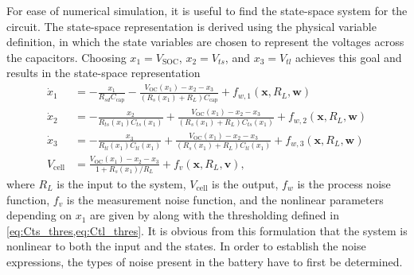 \documentclass[../zhang_thesis.tex]{subfiles}
\begin{document}
For ease of numerical simulation, it is useful to find the state-space system for the circuit. The state-space representation is derived using the physical variable definition, in which the state variables are chosen to represent the voltages across the capacitors. Choosing $x_1=V_\text{SOC}$, $x_2=V_{ts}$, and $x_3=V_{tl}$ achieves this goal and results in the state-space representation
\begin{align}
    \dot{x}_1 &= - \frac{x_1}{R_{sd}C_\text{cap}} - \frac{V_\text{OC}(x_1)-x_2-x_3}{(R_s(x_1)+R_L)C_\text{cap}} + f_{w,1}(\mathbf{x},R_L,\mathbf{w}) \\
    \dot{x}_2 &= - \frac{x_2}{R_{ts}(x_1)C_{ts}(x_1)} + \frac{V_\text{OC}(x_1) - x_2 - x_3}{(R_s(x_1)+R_L)C_{ts}(x_1)} + f_{w,2}(\mathbf{x},R_L,\mathbf{w}) \\
    \dot{x}_3 &= - \frac{x_3}{R_{tl}(x_1)C_{tl}(x_1)} + \frac{V_\text{OC}(x_1) - x_2 - x_3}{(R_s(x_1)+R_L)C_{tl}(x_1)} + f_{w,3}(\mathbf{x},R_L,\mathbf{w}) \\
    V_\text{cell} &= \frac{V_\text{OC}(x_1) - x_2 - x_3}{1+R_s(x_1)/R_L} + f_v(\mathbf{x},R_L,\mathbf{v}),
\end{align}
where $R_L$ is the input to the system, $V_\text{cell}$ is the output, $f_w$ is the process noise function, $f_v$ is the measurement noise function, and the nonlinear parameters depending on $x_1$ are given by  along with the thresholding defined in \cref{eq:Cts_thres,eq:Ctl_thres}. It is obvious from this formulation that the system is nonlinear to both the input and the states. In order to establish the noise expressions, the types of
noise present in the battery have to first be determined.
\end{document}

